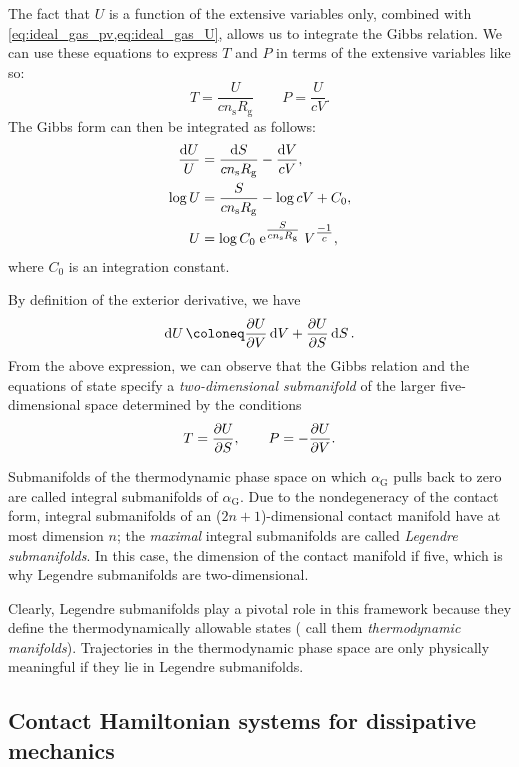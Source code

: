 
The fact that $U$ is a function of the extensive variables only, combined with \cref{eq:ideal_gas_pv,eq:ideal_gas_U}, allows us to integrate the Gibbs relation. We can use these equations to express $T$ and $P$ in terms of the extensive variables like so:
$$ T = \frac{U}{cn_\text{s}R_\text{g}} \qquad P = \frac{U}{cV}. $$
The Gibbs form can then be integrated as follows:
\begin{equation*}
    \begin{split}
        \frac{\dd{U}}{U} &= \frac{\dd{S}}{cn_\text{s}R_\text{g}} - \frac{\dd{V}}{c V},\\
        \log{U}  &= \frac{S}{ cn_\text{s}R_\text{g}} - \log{c V} + C_0, \\
        U  &= \log{C_0} \; \mathrm{e}^{\tfrac{S}{ cn_\text{s}R_\text{g}}} \; V^{\tfrac{-1}{c}},\\
    \end{split}
\end{equation*}
where $C_0$ is an integration constant.

By definition of the exterior derivative, we have
$$ \dd{U} \coloneq \pdv{U}{V}\dd{V} + \pdv{U}{S}\dd{S}.$$
From the above expression, we can observe that the Gibbs relation and the equations of state specify a \emph{two-dimensional submanifold} of the larger five-dimensional space determined by the conditions
\begin{equation}
    T = \pdv{U}{S}, \qquad P = -\pdv{U}{V}. 
\end{equation}

Submanifolds of the thermodynamic phase space on which $\alpha_\text{G}$ pulls back to zero are called integral submanifolds of $\alpha_\text{G}$. Due to the nondegeneracy of the contact form, integral submanifolds of an ($2n+1$)-dimensional contact manifold have at most dimension $n$; the \emph{maximal} integral submanifolds are called \emph{Legendre submanifolds}. In this case, the dimension of the contact manifold if five, which is why Legendre submanifolds are two-dimensional.

Clearly, Legendre submanifolds play a pivotal role in this framework because they define the thermodynamically allowable states (\citet{Balian2001} call them \emph{thermodynamic manifolds}). Trajectories in the thermodynamic phase space are only physically meaningful if they lie in Legendre submanifolds.

\subsection{Contact Hamiltonian systems for dissipative mechanics}
\label{ssec:contact_dissipation}

